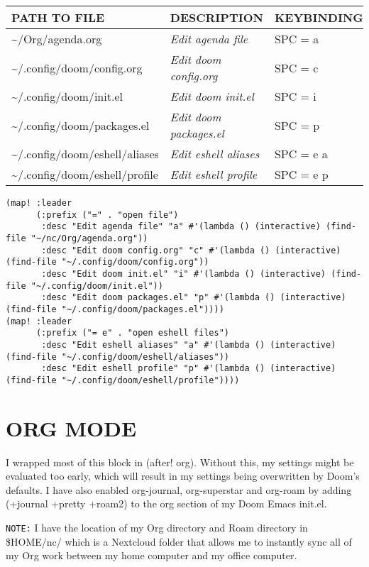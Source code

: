 \documentclass[11pt]{article}
\begin{document}
\begin{center}
\begin{tabular}{lll}
PATH TO FILE & DESCRIPTION & KEYBINDING\\[0pt]
\hline
\textasciitilde{}/Org/agenda.org & \emph{Edit agenda file} & SPC = a\\[0pt]
\textasciitilde{}/.config/doom/config.org & \emph{Edit doom config.org} & SPC = c\\[0pt]
\textasciitilde{}/.config/doom/init.el & \emph{Edit doom init.el} & SPC = i\\[0pt]
\textasciitilde{}/.config/doom/packages.el & \emph{Edit doom packages.el} & SPC = p\\[0pt]
\textasciitilde{}/.config/doom/eshell/aliases & \emph{Edit eshell aliases} & SPC = e a\\[0pt]
\textasciitilde{}/.config/doom/eshell/profile & \emph{Edit eshell profile} & SPC = e p\\[0pt]
\end{tabular}
\end{center}

\begin{verbatim}
(map! :leader
      (:prefix ("=" . "open file")
       :desc "Edit agenda file" "a" #'(lambda () (interactive) (find-file "~/nc/Org/agenda.org"))
       :desc "Edit doom config.org" "c" #'(lambda () (interactive) (find-file "~/.config/doom/config.org"))
       :desc "Edit doom init.el" "i" #'(lambda () (interactive) (find-file "~/.config/doom/init.el"))
       :desc "Edit doom packages.el" "p" #'(lambda () (interactive) (find-file "~/.config/doom/packages.el"))))
(map! :leader
      (:prefix ("= e" . "open eshell files")
       :desc "Edit eshell aliases" "a" #'(lambda () (interactive) (find-file "~/.config/doom/eshell/aliases"))
       :desc "Edit eshell profile" "p" #'(lambda () (interactive) (find-file "~/.config/doom/eshell/profile"))))
\end{verbatim}

\section{ORG MODE}
\label{sec:org22c158f}
I wrapped most of this block in (after! org).  Without this, my settings might be evaluated too early, which will result in my settings being overwritten by Doom's defaults.  I have also enabled org-journal, org-superstar and org-roam by adding (+journal +pretty +roam2) to the org section of my Doom Emacs init.el.

\texttt{NOTE:} I have the location of my Org directory and Roam directory in \$HOME/nc/ which is a Nextcloud folder that allows me to instantly sync all of my Org work between my home computer and my office computer.
\end{document}
